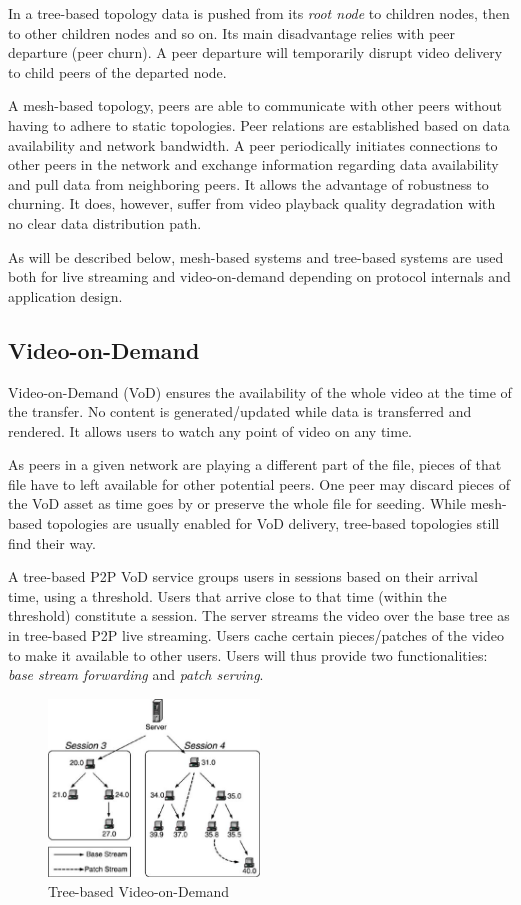 In a tree-based topology data is pushed from its \textit{root node} to
children nodes, then to other children nodes and so on. Its main disadvantage
relies with peer departure (peer churn). A peer departure will temporarily
disrupt video delivery to child peers of the departed node.

A mesh-based topology, peers are able to communicate with other peers without
having to adhere to static topologies. Peer relations are established based on
data availability and network bandwidth. A peer periodically initiates
connections to other peers in the network and exchange information regarding
data availability and pull data from neighboring peers. It allows the
advantage of robustness to churning. It does, however, suffer from video
playback quality degradation with no clear data distribution path.

As will be described below, mesh-based systems and tree-based systems are used
both for live streaming and video-on-demand depending on protocol internals
and application design.

\subsection{Video-on-Demand}
\label{subsec:p2p-systems:vod}

Video-on-Demand (VoD) ensures the availability of the whole video at the time
of the transfer. No content is generated/updated while data is transferred and
rendered. It allows users to watch any point of video on any time.

As peers in a given network are playing a different part of the file, pieces
of that file have to left available for other potential peers. One peer may
discard pieces of the VoD asset as time goes by or preserve the whole file for
seeding. While mesh-based topologies are usually enabled for VoD delivery,
tree-based topologies still find their way.

A tree-based P2P VoD service groups users in sessions based on their arrival
time, using a threshold. Users that arrive close to that time (within the
threshold) constitute a session. The server streams the video over the base
tree as in tree-based P2P live streaming. Users cache certain pieces/patches
of the video to make it available to other users. Users will thus provide two
functionalities: \textit{base stream forwarding} and \textit{patch serving}.

\begin{figure}
  \centering
  \includegraphics[width=0.5\textwidth]{src/img/p2p-systems/tree-based-vod}
  \caption{Tree-based Video-on-Demand}
  \label{fig:p2p-systems:tree-based-vod}
\end{figure}

